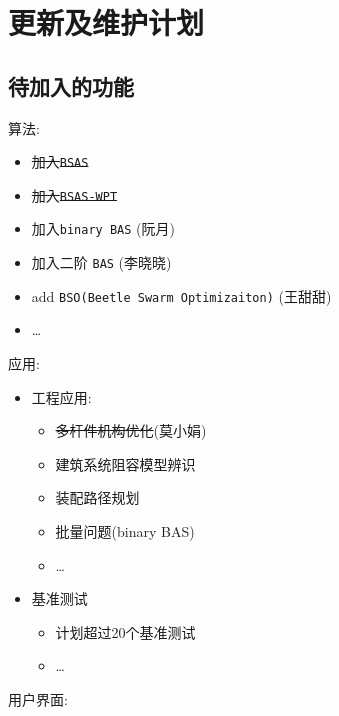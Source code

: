 \documentclass[]{ctexbook}
\providecommand{\tightlist}{%
  \setlength{\itemsep}{0pt}\setlength{\parskip}{0pt}}
\theoremstyle{definition}
\theoremstyle{definition}
\theoremstyle{definition}
\theoremstyle{remark}
\begin{document}
\chapter{更新及维护计划}\label{updates}

\section{待加入的功能}

算法:

\begin{itemize}
\tightlist
\item
  \sout{加入\texttt{BSAS}}
\item
  \sout{加入\texttt{BSAS-WPT}}
\item
  加入\texttt{binary\ BAS} (阮月)
\item
  加入二阶 \texttt{BAS} (李晓晓)
\item
  add \texttt{BSO(Beetle\ Swarm\ Optimizaiton)} (王甜甜)
\item
  \ldots{}
\end{itemize}

应用:

\begin{itemize}
\tightlist
\item
  工程应用:

  \begin{itemize}
  \tightlist
  \item
    \sout{多杆件机构优化}(莫小娟)
  \item
    建筑系统阻容模型辨识
  \item
    装配路径规划
  \item
    批量问题(binary BAS)
  \item
    \ldots{}
  \end{itemize}
\item
  基准测试

  \begin{itemize}
  \tightlist
  \item
    计划超过20个基准测试
  \item
    \ldots{}
  \end{itemize}
\end{itemize}

用户界面:
\end{document}
